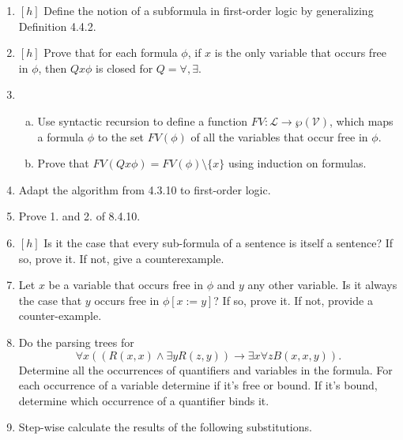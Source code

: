 	\begin{enumerate}[\thesection.1]
	
		\item $[h]$ Define the notion of a subformula in first-order logic by generalizing Definition 4.4.2.
		
		\item $[h]$ Prove that for each formula $\phi$, if $x$ is the only variable that occurs free in $\phi$, then $Q x\phi$ is closed for $Q=\forall,\exists$.
		
		\item \begin{enumerate}[(a)]
		
		\item Use syntactic recursion to define a function $FV:\mathcal{L}\to\wp(\mathcal{V})$, which maps a formula $\phi$ to the set $FV(\phi)$ of all the variables that occur free in $\phi$.
				
		\item Prove that $FV(Qx\phi)=FV(\phi)\setminus\{x\}$ using induction on formulas.
		
		\end{enumerate}
		
		\item Adapt the algorithm from 4.3.10 to first-order logic.
		
		\item Prove 1. and 2. of 8.4.10.
		
		\item $[h]$ Is it the case that every sub-formula of a sentence is itself a sentence? If so, prove it. If not, give a counterexample.
		
		\item Let $x$ be a variable that occurs free in $\phi$ and $y$ any other variable. Is it always the case that $y$ occurs free in $\phi[x:=y]$? If so, prove it. If not, provide a counter-example.
		
		\item Do the parsing trees for  \[\forall x((R(x,x)\land \exists yR(z,y))\to \exists x\forall zB(x,x,y)).\] Determine all the occurrences of quantifiers and variables in the formula. For each occurrence of a variable determine if it's free or bound. If it's bound, determine which occurrence of a quantifier binds it.
			
		\item Step-wise calculate the results of the following substitutions.
		
		\begin{enumerate}[(i)]


\end{enumerate}
\end{enumerate}
